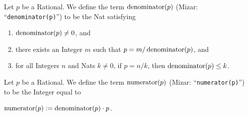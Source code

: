 \documentclass{article}
\begin{document}
\begin{definition}
Let $p$ be a Rational.
We define the term $\operatorname{denominator}(p)$ (Mizar: ``\verb#denominator(p)#'')
to be the Nat satisfying
\begin{defn}
\item \begin{enumerate}[label=(\roman*)]
\item $\operatorname{denominator}(p)\neq0$, and
\item there exists an Integer $m$ such that $p=m/\operatorname{denominator}(p)$, and
\item for all Integers $n$ and Nats $k\neq0$, if $p=n/k$, then
  $\operatorname{denominator}(p)\leq k$.
\end{enumerate}
\end{defn}
\end{definition}

\begin{definition}
Let $p$ be a Rational.
We define the term $\operatorname{numerator}(p)$ (Mizar: ``\verb#numerator(p)#'') to
be the Integer equal to
\begin{defn}
\item $\operatorname{numerator}(p) := \operatorname{denominator}(p)\cdot p$.
\end{defn}
\end{definition}
\end{document}
